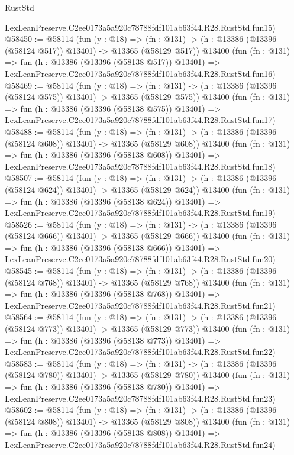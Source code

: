 \begin{lexlean}{RustStd}
\begin{coremodule}
    LexLeanPreserve.C2ee0173a5a920c78788fdf101ab63f44.R28.RustStd.fun15)
@58450 := @58114
    (fun (y : @18) =>
    (fn : @131) -> (h : @13386 (@13396 (@58124 @517)) @13401) -> @13365 (@58129 @517))
    @13400
    (fun (fn : @131) =>
    fun (h : @13386 (@13396 (@58138 @517)) @13401) =>
    LexLeanPreserve.C2ee0173a5a920c78788fdf101ab63f44.R28.RustStd.fun16)
@58469 := @58114
    (fun (y : @18) =>
    (fn : @131) -> (h : @13386 (@13396 (@58124 @575)) @13401) -> @13365 (@58129 @575))
    @13400
    (fun (fn : @131) =>
    fun (h : @13386 (@13396 (@58138 @575)) @13401) =>
    LexLeanPreserve.C2ee0173a5a920c78788fdf101ab63f44.R28.RustStd.fun17)
@58488 := @58114
    (fun (y : @18) =>
    (fn : @131) -> (h : @13386 (@13396 (@58124 @608)) @13401) -> @13365 (@58129 @608))
    @13400
    (fun (fn : @131) =>
    fun (h : @13386 (@13396 (@58138 @608)) @13401) =>
    LexLeanPreserve.C2ee0173a5a920c78788fdf101ab63f44.R28.RustStd.fun18)
@58507 := @58114
    (fun (y : @18) =>
    (fn : @131) -> (h : @13386 (@13396 (@58124 @624)) @13401) -> @13365 (@58129 @624))
    @13400
    (fun (fn : @131) =>
    fun (h : @13386 (@13396 (@58138 @624)) @13401) =>
    LexLeanPreserve.C2ee0173a5a920c78788fdf101ab63f44.R28.RustStd.fun19)
@58526 := @58114
    (fun (y : @18) =>
    (fn : @131) -> (h : @13386 (@13396 (@58124 @666)) @13401) -> @13365 (@58129 @666))
    @13400
    (fun (fn : @131) =>
    fun (h : @13386 (@13396 (@58138 @666)) @13401) =>
    LexLeanPreserve.C2ee0173a5a920c78788fdf101ab63f44.R28.RustStd.fun20)
@58545 := @58114
    (fun (y : @18) =>
    (fn : @131) -> (h : @13386 (@13396 (@58124 @768)) @13401) -> @13365 (@58129 @768))
    @13400
    (fun (fn : @131) =>
    fun (h : @13386 (@13396 (@58138 @768)) @13401) =>
    LexLeanPreserve.C2ee0173a5a920c78788fdf101ab63f44.R28.RustStd.fun21)
@58564 := @58114
    (fun (y : @18) =>
    (fn : @131) -> (h : @13386 (@13396 (@58124 @773)) @13401) -> @13365 (@58129 @773))
    @13400
    (fun (fn : @131) =>
    fun (h : @13386 (@13396 (@58138 @773)) @13401) =>
    LexLeanPreserve.C2ee0173a5a920c78788fdf101ab63f44.R28.RustStd.fun22)
@58583 := @58114
    (fun (y : @18) =>
    (fn : @131) -> (h : @13386 (@13396 (@58124 @780)) @13401) -> @13365 (@58129 @780))
    @13400
    (fun (fn : @131) =>
    fun (h : @13386 (@13396 (@58138 @780)) @13401) =>
    LexLeanPreserve.C2ee0173a5a920c78788fdf101ab63f44.R28.RustStd.fun23)
@58602 := @58114
    (fun (y : @18) =>
    (fn : @131) -> (h : @13386 (@13396 (@58124 @808)) @13401) -> @13365 (@58129 @808))
    @13400
    (fun (fn : @131) =>
    fun (h : @13386 (@13396 (@58138 @808)) @13401) =>
    LexLeanPreserve.C2ee0173a5a920c78788fdf101ab63f44.R28.RustStd.fun24)

\end{coremodule}
\end{lexlean}
